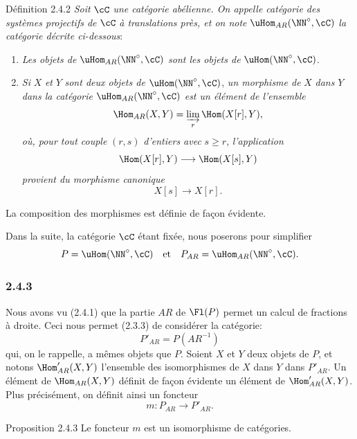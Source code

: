\begin{statement}{Définition 2.4.2}
\emph{Soit} $\cC$ \emph{une catégorie abélienne. On appelle catégorie des systèmes projectifs de} $\cC$ \emph{à translations près, et on note} $\uHom_{AR}(\NN^\circ,\cC)$ \emph{la catégorie décrite ci-dessous}:
\begin{enumerate}[label=(\roman*)]
\item \emph{Les objets de} $\uHom_{AR}(\NN^\circ,\cC)$ \emph{sont les objets de} $\uHom(\NN^\circ,\cC)$.
\item \emph{Si} $X$ \emph{et} $Y$ \emph{sont deux objets de} $\uHom(\NN^\circ,\cC)$, \emph{un morphisme de} $X$ \emph{dans} $Y$ \emph{dans la catégorie} $\uHom_{AR}(\NN^\circ,\cC)$ \emph{est un élément de l'ensemble}
\[
\Hom_{AR}(X,Y)=\varinjlim_r\Hom(X[r],Y),
\]
\emph{où, pour tout couple} $(r,s)$ \emph{d'entiers avec} $s\ge r$, \emph{l'application}
\[
\Hom(X[r],Y)\longrightarrow\Hom(X[s],Y)
\]
\emph{provient du morphisme canonique}
\[
X[s]\longrightarrow X[r].
\]
\end{enumerate}
La composition des morphismes est définie de façon évidente.
\end{statement}
Dans la suite, la catégorie $\cC$ étant fixée, nous poserons pour simplifier
\[
P=\uHom(\NN^\circ,\cC)\quad\text{et}\quad P_{AR}=\uHom_{AR}(\NN^\circ,\cC).
\]

\subsubsection*{2.4.3}
Nous avons vu (2.4.1) que la partie $AR$ de $\Fl(P)$ permet un calcul de fractions à droite. Ceci nous permet (2.3.3) de considérer la catégorie:
\[
P'_{AR}=P(AR^{-1})
\]
qui, on le rappelle, a mêmes objets que $P$.
Soient $X$ et $Y$ deux objets de $P$, et notons $\Hom'_{AR}(X,Y)$ l'ensemble des isomorphismes de $X$ dans $Y$ dans $P'_{AR}$. Un élément de $\Hom_{AR}(X,Y)$ définit de façon évidente un élément de $\Hom'_{AR}(X,Y)$. Plus précisément, on définit ainsi un foncteur
\[
m:P_{AR}\longrightarrow P'_{AR}.
\]

\begin{statement}{Proposition 2.4.3}
Le foncteur $m$ est un isomorphisme de catégories.
\end{statement}

